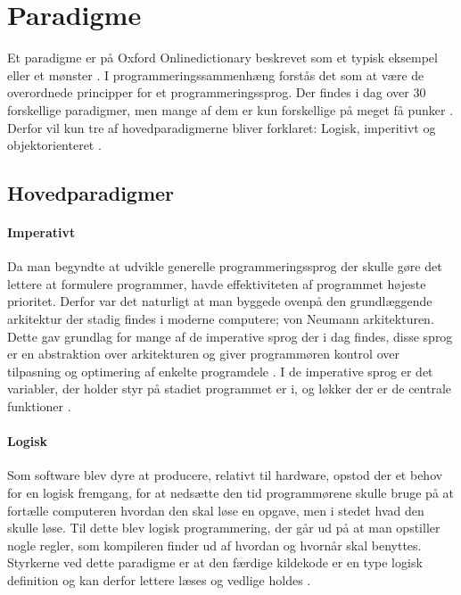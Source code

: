\section{Paradigme}\label{sec:paradigmer}

Et paradigme er på Oxford Onlinedictionary beskrevet som et typisk eksempel eller et mønster \cite{Oxford_????}. I programmeringssammenhæng forstås det som at være de overordnede principper for et programmeringssprog. Der findes i dag over 30 forskellige paradigmer, men mange af dem er kun forskellige på meget få punker \cite{Roy_2009}. Derfor vil kun tre af hovedparadigmerne bliver forklaret: Logisk, imperitivt og objektorienteret \cite{Normark_2003}.

\subsection{Hovedparadigmer}\label{ssec:hovedparadigmer}
\paragraph{Imperativt}
Da man begyndte at udvikle generelle programmeringssprog der skulle gøre det lettere at formulere programmer, havde effektiviteten af programmet højeste prioritet. Derfor var det naturligt at man byggede ovenpå den grundlæggende arkitektur der stadig findes i moderne computere; von Neumann arkitekturen. Dette gav grundlag for mange af de imperative sprog der i dag findes, disse sprog er en abstraktion over arkitekturen og giver programmøren kontrol over tilpasning og optimering af enkelte programdele \cite[38-39]{Sebesta_2013}. I de imperative sprog er det variabler, der holder styr på stadiet programmet er i, og løkker der er de centrale funktioner \cite{Sebesta_2013}.

\paragraph{Logisk}
Som software blev dyre at producere, relativt til hardware, opstod der et behov for en logisk fremgang, for at nedsætte den tid programmørene skulle bruge på at fortælle computeren hvordan den skal løse en opgave, men i stedet hvad den skulle løse. Til dette blev logisk programmering, der går ud på at man opstiller nogle regler, som kompileren finder ud af hvordan og hvornår skal benyttes. Styrkerne ved dette paradigme er at den færdige kildekode er en type logisk definition og kan derfor lettere læses og vedlige holdes \cite[kapitel 16]{Sebesta_2013}.

